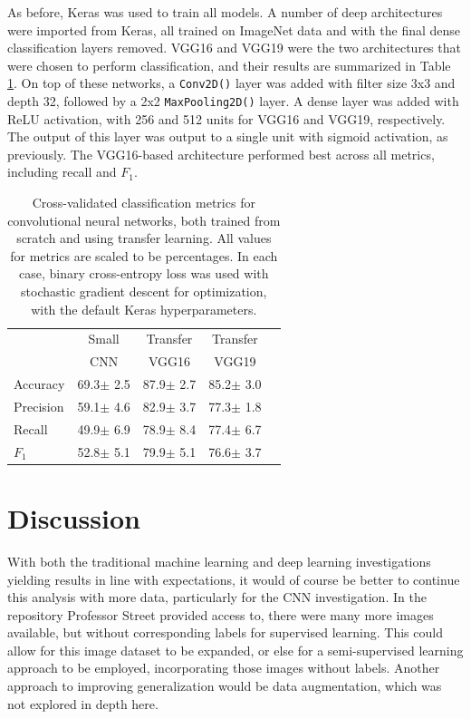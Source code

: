 \documentclass{article}
\begin{document}
	As before, Keras was used to train all models. A number of deep architectures were imported from Keras, all trained on ImageNet data and with the final dense classification layers removed. VGG16 and VGG19 were the two architectures that were chosen to perform classification, and their results are summarized in Table \ref{CNN-table}. On top of these networks, a \texttt{Conv2D()} layer was added with filter size 3x3 and depth 32, followed by a 2x2 \texttt{MaxPooling2D()} layer. A dense layer was added with ReLU activation, with 256 and 512 units for VGG16 and VGG19, respectively. The output of this layer was output to a single unit with sigmoid activation, as previously. The VGG16-based architecture performed best across all metrics, including recall and $F_1$.
	
		\begin{table}[t]
		\caption{Cross-validated classification metrics for convolutional neural networks, both trained from scratch and using transfer learning. All values for metrics are scaled to be percentages. In each case, binary cross-entropy loss was used with stochastic gradient descent for optimization, with the default Keras hyperparameters.}
		\label{CNN-table}
		\vskip 0.15in
		\begin{center}
			\begin{small}
				\begin{sc}
					\begin{tabular}{lcccr}
						\toprule
						& Small & Transfer & Transfer \\
						&CNN&VGG16&VGG19\\
						\midrule
						Accuracy    & 69.3$\pm$ 2.5& 87.9$\pm$ 2.7& 85.2$\pm$ 3.0\\
						Precision 	& 59.1$\pm$ 4.6& 82.9$\pm$ 3.7& 77.3$\pm$ 1.8\\
						Recall    	& 49.9$\pm$ 6.9& 78.9$\pm$ 8.4& 77.4$\pm$ 6.7\\
						$F_{1}$    	& 52.8$\pm$ 5.1& 79.9$\pm$ 5.1& 76.6$\pm$ 3.7\\
						\bottomrule
					\end{tabular}
				\end{sc}
			\end{small}
		\end{center}
		\vskip -0.1in
	\end{table}
	
	
	\section{Discussion}
	With both the traditional machine learning and deep learning investigations yielding results in line with expectations, it would of course be better to continue this analysis with more data, particularly for the CNN investigation. In the repository Professor Street provided access to, there were many more images available, but without corresponding labels for supervised learning. This could allow for this image dataset to be expanded, or else for a semi-supervised learning approach to be employed, incorporating those images without labels. Another approach to improving generalization would be data augmentation, which was not explored in depth here.
	
\end{document}
